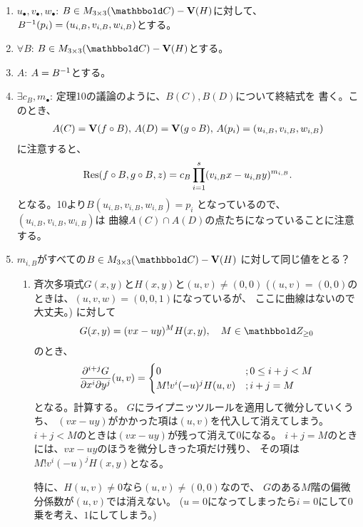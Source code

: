 \begin{myproof}
\begin{enumerate}
    \item $u_{\bullet},v_\bullet,w_\bullet$:
    $B\in M_{3\times 3}(\C) - \var(H)$に対して、
    $B^{-1}(p_i) = (u_{i,B},v_{i,B},w_{i,B})$とする。
    \item $\forall B$: $B\in M_{3\times 3}(\C)- \var(H)$とする。
    \item $A$: $A=B^{-1}$とする。
    \item $\exists c_B, m_\bullet$:
    定理10の議論のように、$B(C),B(D)$について終結式を
    書く。このとき、
    \begin{align}
    A(C) = \textbf V(f\circ B),\, A(D) = \textbf V(g\circ B),\,
    A(p_i) = (u_{i,B},v_{i,B},w_{i,B})
    \end{align}
    に注意すると、
    \begin{align}
      \mathrm{Res}(f\circ B,g\circ B,z)
      =
      c_B\prod_{i=1}^s (v_{i,B}x-u_{i,B}y)^{m_{i,B}}.
    \end{align}
    となる。10より$B(u_{i,B},v_{i,B},w_{i,B}) = p_i$
    となっているので、$(u_{i,B},v_{i,B},w_{i,B})$は
    曲線$A(C) \cap A(D)$の点たちになっていることに注意する。
    \item
    $m_{i,B}$がすべての$B\in M_{3\times 3}(\C)-\var(H)$
    に対して同じ値をとる？
    \begin{enumerate}
      \item 斉次多項式$G(x,y)$と$H(x,y)$と$(u,v)\neq (0,0)$
      ($(u,v)=(0,0)$のときは、$(u,v,w)=(0,0,1)$になっているが、
      ここに曲線はないので大丈夫。)
      に対して
      \begin{align}
        G(x,y) = (vx-uy)^M H(x,y),\quad M\in \Zge
      \end{align}
      のとき、
      \begin{align}
        \frac{\partial^{i+j}G}{\partial x^i \partial y^j}(u,v)
        =
        \begin{cases}
          0 &; 0\le i+ j < M\\
          M! v^i (-u)^j H(u,v) &; i+j = M
        \end{cases}
      \end{align}
      となる。計算する。
      $G$にライプニッツルールを適用して微分していくうち、
      $(vx-uy)$がかかった項は$(u,v)$を代入して消えてしまう。
      $i+j < M$のときは$(vx-uy)$が残って消えて0になる。
      $i+j=M$のときには、$vx-uy$のほうを微分しきった項だけ残り、
      その項は$M! v^{i} (-u)^j H(x,y)$となる。

      特に、$H(u,v) \neq 0$なら$(u,v)\neq (0,0)$なので、
      $G$のある$M$階の偏微分係数が$(u,v)$では消えない。
      ($u=0$になってしまったら$i=0$にして0乗を考え、$1$にしてしまう。)


\end{enumerate}
\end{enumerate}
\end{myproof}
